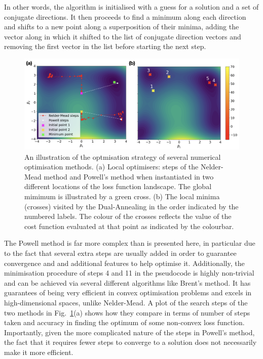 In other words, the algorithm is initialised with a guess for a solution and a set of conjugate directions. It then proceeds to find a minimum along each direction and shifts to a new point along a superposition of their minima, adding the vector along in which it shifted to the list of conjugate direction vectors and removing the first vector in the list before starting the next step.

\begin{figure}[t]
\centering
\includegraphics[width=\linewidth]{images_v1/optimiser_plots.png} \caption[Visualising optimisers in action]{An illustration of the optmisation strategy of several numerical optimisation methods. (a) Local optimisers: steps of the Nelder-Mead method and Powell's method when instantiated in two different locations of the loss function landscape. The global mimimum is illustrated by a green cross. (b) The local minima (crosses) visited by the Dual-Annealing in the order indicated by the numbered labels. The colour of the crosses reflects the value of the cost function evaluated at that point as indicated by the colourbar.}\label{fig:optimisers}
\end{figure}

The Powell method is far more complex than is presented here, in particular due to the fact that several extra steps are usually added in order to guarantee convergence and and additional features to help optimise it. Additionally, the minimisation procedure of steps 4 and 11 in the pseudocode is highly non-trivial and can be achieved via several different algorithms like Brent's method\cite{brent_algorithms_2002}. It has guarantees of being very efficient in convex optimisation problems and excels in high-dimensional spaces, unlike Nelder-Mead. A plot of the search steps of the two methods in Fig.~\ref{fig:optimisers}(a) shows how they compare in terms of number of steps taken and accuracy in finding the optimum of some non-convex loss function. Importantly, given the more complicated nature of the steps in Powell's method, the fact that it requires fewer steps to converge to a solution does not necessarily make it more efficient.

